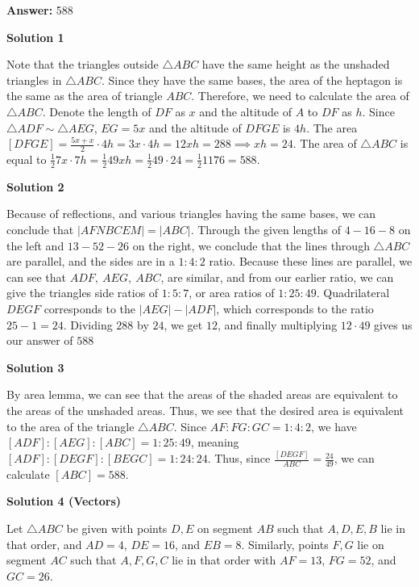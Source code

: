 \begin{enumerate}
 \textbf{Answer: }588



\textbf{Solution 1}

Note that the triangles outside $\triangle ABC$ have the same height as the unshaded triangles in $\triangle ABC$. Since they have the same bases, the area of the heptagon is the same as the area of triangle $ABC$. Therefore, we need to calculate the area of $\triangle ABC$. Denote the length of $DF$ as $x$ and the altitude of $A$ to $DF$ as $h$. Since $\triangle ADF \sim \triangle AEG$, $EG = 5x$ and the altitude of $DFGE$ is $4h$. The area $[DFGE] = \frac{5x + x}{2} \cdot 4h = 3x \cdot 4h = 12xh = 288 \implies xh = 24$. The area of $\triangle ABC$ is equal to $\frac{1}{2} 7x \cdot 7h = \frac{1}{2} 49xh = \frac{1}{2} 49 \cdot 24 = \frac{1}{2} 1176 = \boxed{588}$.

 



\textbf{Solution 2}

Because of reflections, and various triangles having the same bases, we can conclude that $|AFNBCEM| = |ABC|$. Through the given lengths of $4-16-8$ on the left and $13-52-26$ on the right, we conclude that the lines through $\triangle ABC$ are parallel, and the sides are in a $1:4:2$ ratio. Because these lines are parallel, we can see that $ADF,~AEG,~ABC$, are similar, and from our earlier ratio, we can give the triangles side ratios of $1:5:7$, or area ratios of $1:25:49$. Quadrilateral $DEGF$ corresponds to the $|AEG|-|ADF|$, which corresponds to the ratio $25-1=24$. Dividing $288$ by $24$, we get $12$, and finally multiplying $12 \cdot 49$ gives us our answer of $\boxed{588}$




\textbf{Solution 3}

By area lemma, we can see that the areas of the shaded areas are equivalent to the areas of the unshaded areas. Thus, we see that the desired area is equivalent to the area of the triangle $\triangle ABC$. Since $AF : FG : GC = 1 : 4 : 2$, we have $[ADF]:[AEG]:[ABC] = 1:25:49$, meaning $[ADF]:[DEGF]:[BEGC] = 1:24:24$. Thus, since $\frac{[DEGF]}{ABC} = \frac{24}{49}$, we can calculate $[ABC] = 588$.

 



\textbf{Solution 4 (Vectors)}

Let \( \triangle ABC \) be given with points \( D, E \) on segment \( AB \) such that \( A, D, E, B \) lie in that order, and \( AD = 4 \), \( DE = 16 \), and \( EB = 8 \). Similarly, points \( F, G \) lie on segment \( AC \) such that \( A, F, G, C \) lie in that order with \( AF = 13 \), \( FG = 52 \), and \( GC = 26 \).


\end{enumerate}
